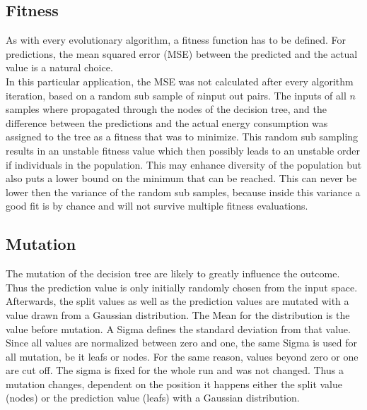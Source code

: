 \documentclass[conference]{IEEEtran}
\begin{document}
\subsection{Fitness}
As with every evolutionary algorithm, a fitness function has to be defined. For predictions, the mean squared error (MSE) between the predicted and the actual value is a natural choice. \\
In this particular application, the MSE was not calculated after every algorithm iteration, based on a random sub sample of $ n $input out pairs. The inputs of all $n$ samples where propagated through the nodes of the decision tree, and the difference between the predictions and the actual energy consumption was assigned to the tree as a fitness that was to minimize. This random  sub sampling results in an unstable fitness value which then possibly leads to an unstable order if individuals in the population. This may enhance diversity of the population but also puts a lower bound on the minimum that can be reached. This can never be lower then the variance of the random sub samples, because inside this variance a good fit is by chance and will not survive multiple fitness evaluations.

\subsection{Mutation}
The mutation of the decision tree are likely to greatly influence the outcome. Thus the prediction value is only initially randomly chosen from the input space. Afterwards, the split values as well as the prediction values are mutated with a value drawn from a Gaussian distribution. The Mean for the distribution is the value before mutation. A Sigma defines the standard deviation from that value. Since all values are normalized between zero and one, the same Sigma is used for all mutation, be it leafs or nodes. For the same reason, values beyond zero or one are cut off. The sigma is fixed for the whole run and was not changed. Thus a mutation changes, dependent on the position it happens either the split value (nodes) or the prediction value (leafs) with a Gaussian distribution.
\end{document}
